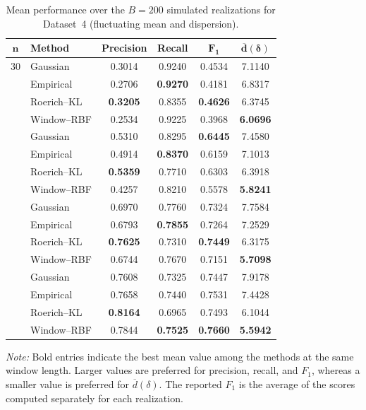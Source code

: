 \begin{table}[!htbp]
    \centering
    \caption{Mean performance over the \(B=200\) simulated realizations for Dataset~4 (fluctuating mean and dispersion).}
    \label{tab:mean_metrics_dataset4}
    \small
    \setlength{\tabcolsep}{5pt}
    \renewcommand{\arraystretch}{1.08}
    \begin{tabular}{@{}clcccc@{}}
        \toprule
        \(\boldsymbol{n}\) & \textbf{Method} & \textbf{Precision} & \textbf{Recall} & \(\boldsymbol{F_1}\) & \(\boldsymbol{\overline{d}(\delta)}\) \\
        \midrule
        30 & Gaussian & 0.3014 & 0.9240 & 0.4534 & 7.1140 \\
         & Empirical & 0.2706 & \textbf{0.9270} & 0.4181 & 6.8317 \\
         & Roerich--KL & \textbf{0.3205} & 0.8355 & \textbf{0.4626} & 6.3745 \\
         & Window--RBF & 0.2534 & 0.9225 & 0.3968 & \textbf{6.0696} \\
        \addlinespace[2pt]
        50 & Gaussian & 0.5310 & 0.8295 & \textbf{0.6445} & 7.4580 \\
         & Empirical & 0.4914 & \textbf{0.8370} & 0.6159 & 7.1013 \\
         & Roerich--KL & \textbf{0.5359} & 0.7710 & 0.6303 & 6.3918 \\
         & Window--RBF & 0.4257 & 0.8210 & 0.5578 & \textbf{5.8241} \\
        \addlinespace[2pt]
        80 & Gaussian & 0.6970 & 0.7760 & 0.7324 & 7.7584 \\
         & Empirical & 0.6793 & \textbf{0.7855} & 0.7264 & 7.2529 \\
         & Roerich--KL & \textbf{0.7625} & 0.7310 & \textbf{0.7449} & 6.3175 \\
         & Window--RBF & 0.6744 & 0.7670 & 0.7151 & \textbf{5.7098} \\
        \addlinespace[2pt]
        100 & Gaussian & 0.7608 & 0.7325 & 0.7447 & 7.9178 \\
         & Empirical & 0.7658 & 0.7440 & 0.7531 & 7.4428 \\
         & Roerich--KL & \textbf{0.8164} & 0.6965 & 0.7493 & 6.1044 \\
         & Window--RBF & 0.7844 & \textbf{0.7525} & \textbf{0.7660} & \textbf{5.5942} \\
        \bottomrule
    \end{tabular}
    \begin{flushleft}
        \footnotesize \textit{Note:} Bold entries indicate the best mean value among the methods at the same window length. Larger values are preferred for precision, recall, and \(F_1\), whereas a smaller value is preferred for \(\overline{d}(\delta)\). The reported \(F_1\) is the average of the scores computed separately for each realization.
    \end{flushleft}
\end{table}